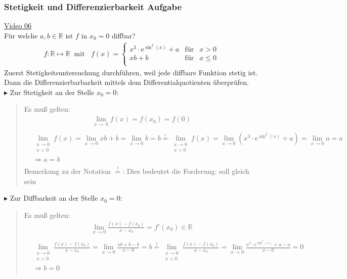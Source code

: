 \subsubsection{Stetigkeit und Differenzierbarkeit Aufgabe}
\href{https://youtu.be/5wELQFVR_XA}{Video 06}\\
Für welche $ a,b\in \mathbb{R} $ ist $ f $ in $x_0=0$ diffbar?\\
\begin{align*}
f:\mathbb{R}\longmapsto \mathbb{R}\;\;\text{mit }\;\;f(x) =     \left\{ \begin{array}{rcl}
x^3\cdot \mathrm{e}^{\sin^2(x)}+a & \mbox{für} & x>0\\
xb+b & \mbox{für} & x\leq 0 \\
\end{array}\right.
\end{align*}
Zuerst Stetigkeitsuntersuchung durchführen, weil jede diffbare Funktion stetig ist. Dann die Differenzierbarbarkeit mittels dem Differentialquotienten überprüfen.\vspace*{2mm}\\
$\blacktriangleright$ Zur Stetigkeit an der Stelle $ x_0=0 $:\\
\begin{quote}
	Es muß gelten:\\
	\begin{align*}
	\lim\limits_ {x\to\ 0}f(x)=f(x_0)=f(0)\\
	\end{align*}
	\begin{align*}
	&\lim\limits_ {\substack{x \to 0 \\ x<0}}f(x)=\lim\limits_ {x\to 0}xb+b=\lim\limits_ {x\to0}b=b\overset{!}{=}\lim\limits_ {\substack{x \to 0 \\ x>0}}f(x)=\lim\limits_ {x\to 0}(x^3\cdot \mathrm{e}^{\sin^2(x)}+a)=\lim\limits_ {x\to 0}a=a\\
	&\Rightarrow a=b\\
	\end{align*}
	Bemerkung zu der Notation \grqq$\overset{!}{=}  $\glqq :  Dies bedeutet die Forderung: \grqq  soll gleich sein\glqq\\
\end{quote}
$\blacktriangleright$ Zur Diffbarkeit an der Stelle $ x_0=0 $:\\
\begin{quote}
	Es muß gelten:\\
	\begin{align*}
	\lim\limits_ {x\to 0}\frac{f(x)-f(x_0)}{x-x_0}=f'(x_0)\in\mathbb{R}\\
	\end{align*}
	\begin{align*}
	&\lim\limits_ {\substack{x \to 0 \\ x<0}}\frac{f(x)-f(x_0)}{x-x_0}=\lim\limits_ {x\to 0}\frac{xb+b-b}{x-0}=b\overset{!}{=}	\lim\limits_ {\substack{x \to 0 \\ x>0}}\frac{f(x)-f(x_0)}{x-x_0}=\lim\limits_ {x\to 0}\frac{x^3\cdot \mathrm{e}^{\sin^2(x)}+a-a}{x-0}=0\\
	&\Rightarrow b=0\\
	\end{align*}
\end{quote}
